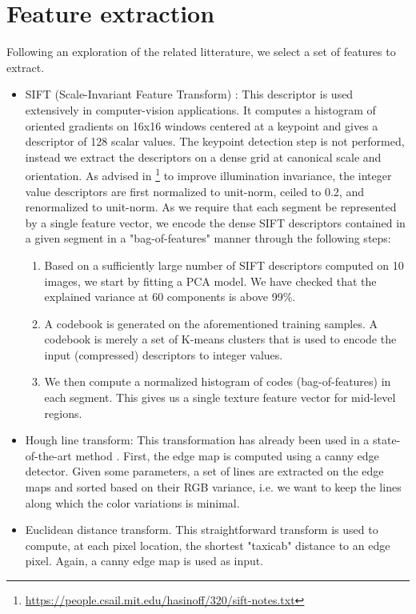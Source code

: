 \documentclass[10pt,conference,compsocconf]{IEEEtran}
\begin{document}
\section{Feature extraction}
\label{sec:orgheadline9}
Following an exploration of the related litterature, we select a set of features to extract.
\begin{itemize}
\item SIFT (Scale-Invariant Feature Transform) \cite{lowe99}: This descriptor is used extensively in computer-vision applications. It computes a histogram of oriented gradients on 16x16 windows centered at a keypoint and gives a descriptor of 128 scalar values. The keypoint detection step is not performed, instead we extract the descriptors on a dense grid at canonical scale and orientation. As advised in \footnote{\url{https://people.csail.mit.edu/hasinoff/320/sift-notes.txt}



\printbibliography} to improve illumination invariance, the integer value descriptors are first normalized to unit-norm, ceiled to 0.2, and renormalized to unit-norm. As we require that each segment be represented by a single feature vector, we encode the dense SIFT descriptors contained in a given segment in a "bag-of-features" manner through the following steps: 
\begin{enumerate}
\item Based on a sufficiently large number of SIFT descriptors computed on 10 images, we start by fitting a PCA model. We have checked that the explained variance at 60 components is above 99\%.
\item A codebook is generated on the aforementioned training samples. A codebook is merely a set of K-means clusters that is used to encode the input (compressed) descriptors to integer values.
\item We then compute a normalized histogram of codes (bag-of-features) in each segment. This gives us a single texture feature vector for mid-level regions.
\end{enumerate}
\item Hough line transform: This transformation has already been used in a state-of-the-art method \cite{2016ISPAr41B3..891L}. First, the edge map is computed using a canny edge detector. Given some parameters, a set of lines are extracted on the edge maps and sorted based on their RGB variance, i.e. we want to keep the lines along which the color variations is minimal.
\item Euclidean distance transform. This straightforward transform is used to compute, at each pixel location, the shortest "taxicab" distance to an edge pixel. Again, a canny edge map is used as input.
\end{itemize}
\end{document}
